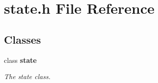 \section{state.\-h File Reference}
\label{state_8h}
\subsection*{Classes}
\begin{DoxyCompactItemize}
\item 
class {\bf state}
\begin{DoxyCompactList}\small\item\em The state class. \end{DoxyCompactList}\end{DoxyCompactItemize}
